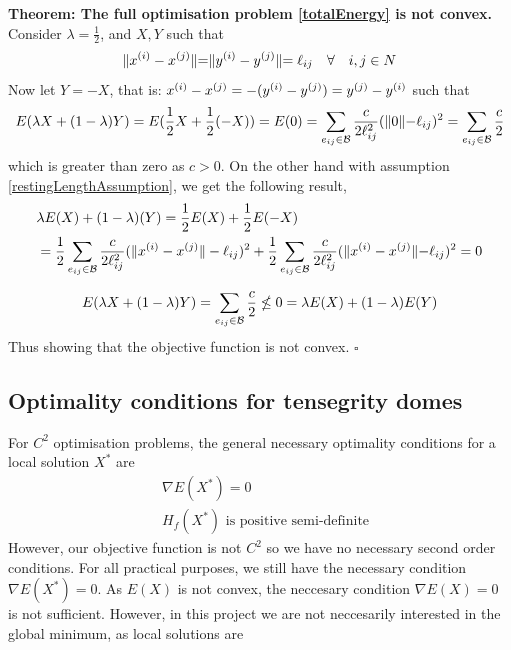 \textbf{Theorem: The full optimisation problem \eqref{totalEnergy} is not convex.}\\
Consider $\lambda = \frac{1}{2}$, and $X,Y$ such that 
\begin{equation}
\label{restingLengthAssumption}
    \rVert x^{(i)}-x^{(j)} \lVert = \rVert y^{(i)}-y^{(j)} \lVert = \ell_{ij} \quad \forall \quad i,j \in N
\end{equation}
Now let $Y = -X$, that is: $x^{(i)}-x^{(j)} = -(y^{(i)}-y^{(j)}) = y^{(j)}-y^{(i)}$ such that
\begin{equation}
\label{energyConv1}
    E(\lambda X + (1-\lambda) Y) = E(\frac{1}{2}X + \frac{1}{2}(-X)) 
    = E(0) = \sum\limits_{e_{ij} \in \mathcal{B}} \frac{c}{2 \ell_{ij}^2} ( \rVert 0 \lVert - \ell_{ij})^2 = \sum\limits_{e_{ij} \in \mathcal{B}}\frac{c}{2}     
\end{equation}
which is greater than zero as $c>0$.
On the other hand with assumption \eqref{restingLengthAssumption}, we get the following result,
\begin{equation}
\label{energyConv2}
\begin{aligned}    
    &\lambda E(X) + (1-\lambda)(Y) = \frac{1}{2}E(X) + \frac{1}{2}E(-X) \\&
    = \frac{1}{2}\sum\limits_{e_{ij} \in \mathcal{B}} \frac{c}{2\ell_{ij}^2} (\lVert x^{(i)} - x^{(j)}\rVert - \ell_{ij})^2 + \frac{1}{2} \sum\limits_{e_{ij} \in \mathcal{B}}\frac{c}{2\ell_{ij}^2} (\rVert x^{(i)}-x^{(j)}\lVert-\ell_{ij})^2 = 0
    \end{aligned}
\end{equation}

\begin{equation*}
     E(\lambda X + (1-\lambda) Y) = \sum\limits_{e_{ij} \in \mathcal{B}}\frac{c}{2}  \nleq 0  = \lambda E(X) + (1-\lambda)E(Y)
\end{equation*}
Thus showing that the objective function is not convex. \hfill $\square$
\subsection{Optimality conditions for tensegrity domes}
For $C^2$ optimisation problems, the general necessary optimality conditions for a local solution $X^*$ are
\begin{align*}
    &\nabla E(X^*) = 0\\
    & H_f(X^*) \text{ is positive semi-definite}
\end{align*}
However, our objective function is not $C^2$ so we have no necessary second order conditions. For all practical purposes, we still have the necessary condition $\nabla E(X^*) = 0$. As $E(X)$ is not convex, the neccesary condition $\nabla E(X)=0$ is not sufficient. However, in this project we are not neccesarily interested in the global minimum, as local solutions are 
